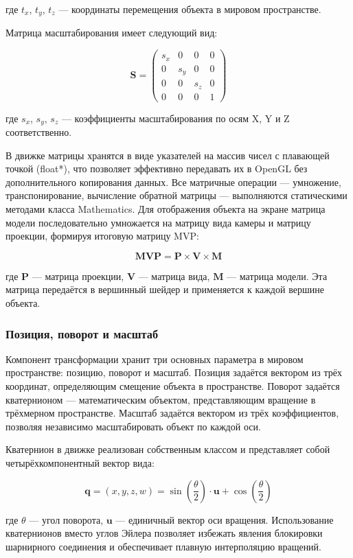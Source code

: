 где $t_x$, $t_y$, $t_z$ — координаты перемещения объекта в мировом пространстве.

Матрица масштабирования имеет следующий вид:

$$
\mathbf{S} = \begin{pmatrix}
	s_x & 0 & 0 & 0 \\
	0 & s_y & 0 & 0 \\
	0 & 0 & s_z & 0 \\
	0 & 0 & 0 & 1
\end{pmatrix}
$$

где $s_x$, $s_y$, $s_z$ — коэффициенты масштабирования по осям X, Y и Z соответственно.

В движке матрицы хранятся в виде указателей на массив чисел с плавающей точкой (float*), что позволяет эффективно передавать их в OpenGL без дополнительного копирования данных. Все матричные операции — умножение, транспонирование, вычисление обратной матрицы — выполняются статическими методами класса Mathematics. Для отображения объекта на экране матрица модели последовательно умножается на матрицу вида камеры и матрицу проекции, формируя итоговую матрицу MVP:

$$
\mathbf{MVP} = \mathbf{P} \times \mathbf{V} \times \mathbf{M}
$$

где $\mathbf{P}$ — матрица проекции, $\mathbf{V}$ — матрица вида, $\mathbf{M}$ — матрица модели. Эта матрица передаётся в вершинный шейдер и применяется к каждой вершине объекта.

\subsubsection{Позиция, поворот и масштаб}
Компонент трансформации хранит три основных параметра в мировом пространстве: позицию, поворот и масштаб. Позиция задаётся вектором из трёх координат, определяющим смещение объекта в пространстве. Поворот задаётся кватернионом — математическим объектом, представляющим вращение в трёхмерном пространстве. Масштаб задаётся вектором из трёх коэффициентов, позволяя независимо масштабировать объект по каждой оси.

Кватернион в движке реализован собственным классом и представляет собой четырёхкомпонентный вектор вида:

$$
\mathbf{q} = (x, y, z, w) = \sin\left(\frac{\theta}{2}\right) \cdot \mathbf{u} + \cos\left(\frac{\theta}{2}\right)
$$

где $\theta$ — угол поворота, $\mathbf{u}$ — единичный вектор оси вращения. Использование кватернионов вместо углов Эйлера позволяет избежать явления блокировки шарнирного соединения и обеспечивает плавную интерполяцию вращений.

